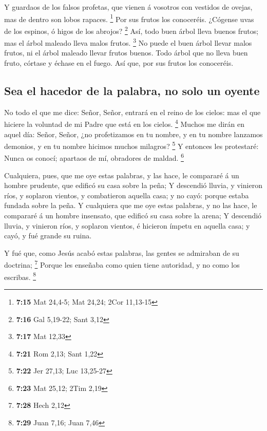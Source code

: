 Y guardaos de los falsos profetas, que vienen á vosotros
con vestidos de ovejas, mas de dentro son lobos rapaces. \footnote{\textbf{7:15}
  Mat 24,4-5; Mat 24,24; 2Cor 11,13-15}  Por sus frutos
los conoceréis. ¿Cógense uvas de los espinos, ó higos de los abrojos?
\footnote{\textbf{7:16} Gal 5,19-22; Sant 3,12}  Así,
todo buen árbol lleva buenos frutos; mas el árbol maleado lleva malos
frutos. \footnote{\textbf{7:17} Mat 12,33}  No puede el
buen árbol llevar malos frutos, ni el árbol maleado llevar frutos
buenos.  Todo árbol que no lleva buen fruto, córtase y
échase en el fuego.  Así que, por sus frutos los
conoceréis.

\hypertarget{sea-el-hacedor-de-la-palabra-no-solo-un-oyente}{%
\subsection{Sea el hacedor de la palabra, no solo un
oyente}\label{sea-el-hacedor-de-la-palabra-no-solo-un-oyente}}

 No todo el que me dice: Señor, Señor, entrará en el
reino de los cielos: mas el que hiciere la voluntad de mi Padre que está
en los cielos. \footnote{\textbf{7:21} Rom 2,13; Sant 1,22}
 Muchos me dirán en aquel día: Señor, Señor, ¿no
profetizamos en tu nombre, y en tu nombre lanzamos demonios, y en tu
nombre hicimos muchos milagros? \footnote{\textbf{7:22} Jer 27,13; Luc
  13,25-27}  Y entonces les protestaré: Nunca os conocí;
apartaos de mí, obradores de maldad. \footnote{\textbf{7:23} Mat 25,12;
  2Tim 2,19}

 Cualquiera, pues, que me oye estas palabras, y las hace,
le compararé á un hombre prudente, que edificó su casa sobre la peña;
 Y descendió lluvia, y vinieron ríos, y soplaron vientos,
y combatieron aquella casa; y no cayó: porque estaba fundada sobre la
peña.  Y cualquiera que me oye estas palabras, y no las
hace, le compararé á un hombre insensato, que edificó su casa sobre la
arena;  Y descendió lluvia, y vinieron ríos, y soplaron
vientos, é hicieron ímpetu en aquella casa; y cayó, y fué grande su
ruina.

 Y fué que, como Jesús acabó estas palabras, las gentes
se admiraban de su doctrina; \footnote{\textbf{7:28} Hech 2,12}
 Porque les enseñaba como quien tiene autoridad, y no
como los escribas. \footnote{\textbf{7:29} Juan 7,16; Juan 7,46}

